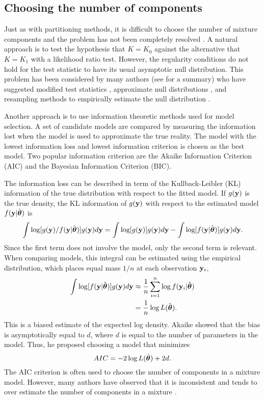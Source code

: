 \subsection{Choosing the number of components}
Just as with partitioning methods, it is difficult to choose the number of mixture components and the problem has not been completely resolved \cite{mclachlan2000}. A natural approach is to test the hypothesis that $K=K_{0}$ against the alternative that $K=K_{1}$ with a likelihood ratio test. However, the regularity conditions do not hold for the test statistic to have its usual asymptotic null distribution. This problem has been considered by many authors (see \textcite{mclachlan2000} for a summary) who have suggested modified test statistics \cite{wolfe1971}, approximate null distributions \cite{lo2001}, and resampling methods to empirically estimate the null distribution \cite{mclachlan1987}.

Another approach is to use information theoretic methods used for model selection. A set of candidate models are compared by measuring the information lost when the model is used to approximate the true reality. The model with the lowest information loss and lowest information criterion is chosen as the best model. Two popular information criterion are the Akaike Information Criterion (AIC) and the Bayesian Information Criterion (BIC). 

The information loss can be described in term of the Kullback-Leibler (KL) information \cite{kullback1951} of the true distribution with respect to the fitted model. If $g(\mathbf y)$ is the true density, the KL information of $g(\mathbf y)$ with respect to the estimated model $f(\mathbf y|\hat{\boldsymbol \theta})$ is
$$\int \log[g(\mathbf y)/f(\mathbf y|\hat{\boldsymbol\theta})]g(\mathbf y)d\mathbf y=\int \log[g(\mathbf y)]g(\mathbf y)d\mathbf y-\int \log[f(\mathbf y|\hat{\boldsymbol\theta})]g(\mathbf y)d\mathbf y.$$
Since the first term does not involve the model, only the second term is relevant. When comparing models, this integral can be estimated using the empirical distribution, which places equal mass $1/n$ at each observation $\mathbf y_{i}$,
\begin{align*}
\int \log[f(\mathbf y|\hat{\boldsymbol\theta})]g(\mathbf y)d\mathbf y &\approx \frac{1}{n} \sum^{n}_{i=1}\log f(\mathbf y_{i}|\hat{\boldsymbol\theta})\\
&=\frac{1}{n} \log L(\hat{\boldsymbol\theta}).
\end{align*}
This is a biased estimate of the expected log density. Akaike \cite{akaike1973,akaike1974} showed that the bias is asymptotically equal to $d$, where $d$ is equal to the number of parameters in the model. Thus, he proposed choosing a model that minimizes
$$AIC = -2\log L(\hat{\boldsymbol\theta}) + 2d.$$
The AIC criterion is often used to choose the number of components in a mixture model. However, many authors have observed that it is inconsistent \cite{koehler1988} and tends to over estimate the number of components in a mixture \cite{soromenho1994,celeux1996}.

